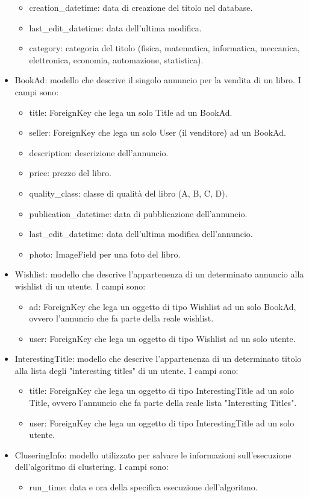 \documentclass[10pt,a4paper]{report}
\begin{document}
\begin{itemize}
\begin{itemize}
				\item creation\_datetime: data di creazione del titolo nel database.
				\item last\_edit\_datetime: data dell'ultima modifica.
				\item category: categoria del titolo (fisica, matematica, informatica, meccanica, elettronica, economia, automazione, statistica).
			\end{itemize}
		\item BookAd: modello che descrive il singolo annuncio per la vendita di un libro. I campi sono:
			\begin{itemize}
				\item title: ForeignKey che lega un solo Title ad un BookAd.
				\item seller: ForeignKey che lega un solo User (il venditore) ad un BookAd.
				\item description: descrizione dell'annuncio.
				\item price: prezzo del libro.
				\item quality\_class: classe di qualità del libro (A, B, C, D).
				\item publication\_datetime: data di pubblicazione dell'annuncio.
				\item last\_edit\_datetime: data dell'ultima modifica dell'annuncio.
				\item photo: ImageField per una foto del libro.
			\end{itemize}
		\item Wishlist: modello che descrive l'appartenenza di un determinato annuncio alla wishlist di un utente. I campi sono:
			\begin{itemize}
				\item ad: ForeignKey che lega un oggetto di tipo Wishlist ad un solo BookAd, ovvero l'annuncio che fa parte della reale wishlist.
				\item user: ForeignKey che lega un oggetto di tipo Wishlist ad un solo utente.
			\end{itemize}
		\item InterestingTitle: modello che descrive l'appartenenza di un determinato titolo alla lista degli "interesting titles" di un utente. I campi sono:
			\begin{itemize}
				\item title: ForeignKey che lega un oggetto di tipo InterestingTitle ad un solo Title, ovvero l'annuncio che fa parte della reale lista "Interesting Titles".
				\item user: ForeignKey che lega un oggetto di tipo InterestingTitle ad un solo utente.
			\end{itemize}
		\item CluseringInfo: modello utilizzato per salvare le informazioni sull'esecuzione dell'algoritmo di clustering. I campi sono: 
			\begin{itemize}
				\item run\_time: data e ora della specifica esecuzione dell'algoritmo.
			\end{itemize}
	\end{itemize}
\end{document}
